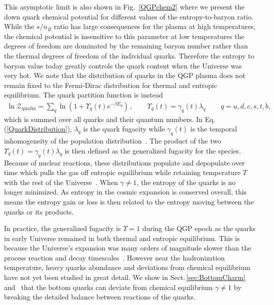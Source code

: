 \documentclass[universe,article,submit,moreauthors,pdftex,a4paper]{Definitions/mdpi}
\newcommand{\req}[1]{Eq.\,(\ref{#1})}
\newcommand*{\rf}[1]{Fig.~{\ref{#1}}}
\newcommand*{\rsec}[1]{Sect.\,{\ref{#1}}}
\begin{document}
This asymptotic limit is also shown in \rf{QGPchem2} where we present the down quark chemical potential for different values of the entropy-to-baryon ratio. While the $s/n_{B}$ ratio has large consequences for the plasma at high temperatures, the chemical potential is insensitive to this parameter at low temperatures the degrees of freedom are dominated by the remaining baryon number rather than the thermal degrees of freedom of the individual quarks. Therefore the entropy to baryon value today greatly controls the quark content when the Universe was very hot. We note that the distribution of quarks in the QGP plasma does not remain fixed to the Fermi-Dirac distribution for thermal and entropic equilibrium. The quark partition function is instead
\begin{align} \label{QuarkDistribution}\ln\mathcal{Z}_{\mathrm{quarks}}=\sum_{q}\ln\left(1+\Upsilon_{q}(t)e^{-\beta E_{q}}\right)\,,\qquad\Upsilon_{q}(t)=\gamma_{q}(t)\lambda_{q}\,\qquad q=u,d,c,s,t,b,
\end{align}
which is summed over all quarks and their quantum numbers. In \req{QuarkDistribution}, $\lambda_{q}$ is the quark fugacity while $\gamma_{q}(t)$ is the temporal inhomogeneity of the population distribution~\cite{Rafelski:2019twp}. The product of the two $\Upsilon_{q}(t)=\gamma_{q}(t)\lambda_{q}$ is then defined as the generalized fugacity for the species. Because of nuclear reactions, these distributions populate and depopulate over time which pulls the gas off entropic equilibrium while retaining temperature $T$ with the rest of the Universe~\cite{Letessier:2002ony}. When $\gamma\neq1$, the entropy of the quarks is no longer minimized. As entropy in the cosmic expansion is conserved overall, this means the entropy gain or loss is then related to the entropy moving between the quarks or its products.

In practice, the generalized fugacity is $\Upsilon=1$  during the QGP epoch as the quarks in early Universe remained in both thermal and entropic equilibrium. This is because the Universe's expansion was many orders of magnitude slower than the process reaction and decay timescales~\cite{Letessier:2002ony}. However near the hadronization temperature, heavy quarks abundance and deviations from chemical equilibrium have not yet been studied in great detail. We show in \rsec{sec:BottomCharm} and~\cite{Yang:2020nne} that the bottom quarks can deviate from chemical equilibrium $\gamma\neq1$ by breaking the detailed balance between reactions of the quarks.
\end{document}
